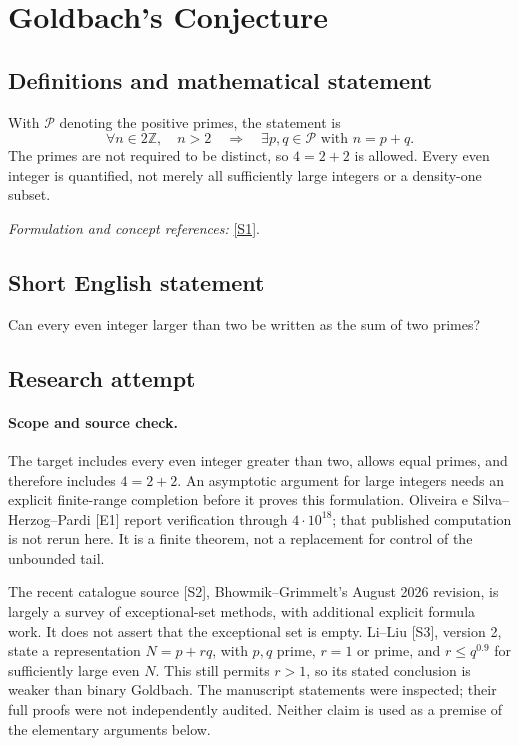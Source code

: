 \documentclass[11pt]{article}
\begin{document}
\section*{\texorpdfstring{Goldbach's Conjecture}{Goldbach's Conjecture}}\label{statement}
\subsection{Definitions and mathematical statement}
With $\mathcal P$ denoting the positive primes, the statement is
\[
 \forall n\in2{\mathbb{Z}},\quad n>2\quad\Longrightarrow\quad
 \exists p,q\in\mathcal P\text{ with }n=p+q.
\]
The primes are not required to be distinct, so $4=2+2$ is allowed. Every even integer is quantified, not merely all sufficiently large integers or a density-one subset.
\par\smallskip\textit{Formulation and concept references:} \href{https://t5k.org/notes/conjectures/}{[S1]}.

\subsection{Short English statement}
Can every even integer larger than two be written as the sum of two primes?
\subsection{Research attempt}

\paragraph{Scope and source check.}
The target includes every even integer greater than two, allows equal
primes, and therefore includes $4=2+2$. An asymptotic argument for large
integers needs an explicit finite-range completion before it proves this
formulation. Oliveira e Silva--Herzog--Pardi [E1] report verification
through $4\cdot10^{18}$; that published computation is not rerun here.
It is a finite theorem, not a replacement for control of the unbounded tail.

The recent catalogue source [S2], Bhowmik--Grimmelt's August 2026 revision,
is largely a survey of exceptional-set methods, with additional explicit
formula work. It does not assert that the exceptional set is empty.
Li--Liu [S3], version 2, state a representation
$N=p+rq$, with $p,q$ prime, $r=1$ or prime, and $r\le q^{0.9}$ for
sufficiently large even $N$. This still permits $r>1$, so its stated
conclusion is weaker than binary Goldbach. The manuscript statements
were inspected; their full proofs were not independently audited.
Neither claim is used as a premise of the elementary arguments below.
\end{document}
